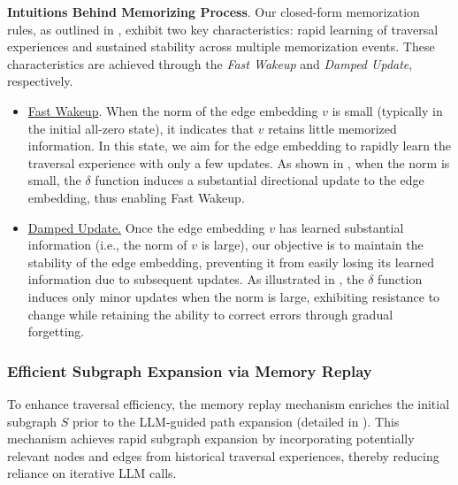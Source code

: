 \textbf{Intuitions Behind Memorizing Process}. Our closed-form memorization rules, as outlined in , exhibit two key characteristics: rapid learning of traversal experiences and sustained stability across multiple memorization events. These characteristics are achieved through the \textit{Fast Wakeup} and \textit{Damped Update}, respectively.
\begin{itemize}[leftmargin=*]
    \item \uline{Fast Wakeup}. When the norm of the edge embedding $v$ is small (typically in the initial all-zero state), it indicates that $v$ retains little memorized information. In this state, we aim for the edge embedding to rapidly learn the traversal experience with only a few updates. As shown in , when the norm is small, the $\delta$ function induces a substantial directional update to the edge embedding, thus enabling Fast Wakeup.
    \item \uline{Damped Update.} Once the edge embedding $v$ has learned substantial information (i.e., the norm of $v$ is large), our objective is to maintain the stability of the edge embedding, preventing it from easily losing its learned information due to subsequent updates. As illustrated in , the $\delta$ function induces only minor updates when the norm is large, exhibiting resistance to change while retaining the ability to correct errors through gradual forgetting.
\end{itemize}



\subsubsection{Efficient Subgraph Expansion via Memory Replay}
\label{sec::memory-replay}

To enhance traversal efficiency, the memory replay mechanism enriches the initial subgraph $S$ prior to the LLM-guided path expansion (detailed in ). This mechanism achieves rapid subgraph expansion by incorporating potentially relevant nodes and edges from historical traversal experiences, thereby reducing reliance on iterative LLM calls.

